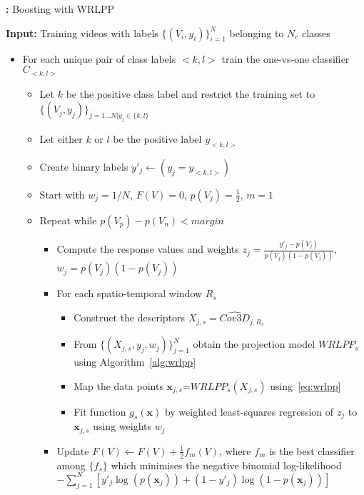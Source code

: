\documentclass[10pt,twocolumn,letterpaper]{article}
\newcommand{\alg}[1]{\mbox{Algorithm~\ref{#1}}}
\newcommand{\cov}{{Cov3D}}
\newcommand{\wrlpp}{WRLPP}
\newcommand{\vect}[1]{{\boldsymbol{#1}}}
\begin{document}
\begin{algorithm}
  \footnotesize
  \raggedright
  \caption{{\bf :} {\footnotesize Boosting with WRLPP}}
  \label{alg:logitboost}
  
  \textbf{Input:} Training videos with labels $\{(V_i,y_i)\}_{i=1}^{N}$ belonging to $N_c$ classes\\
  
  \begin{itemize} \leftskip-1em
    \item For each unique pair of class labels $<k,l>$ train the one-vs-one classifier $C_{<k,l>}$
      \begin{itemize} \leftskip-1em
        \item Let $k$ be the positive class label and restrict the training set to
              $\{(V_j,y_j)\}_{j=1...N|y_j \in \{k,l\}}$
        \item Let either $k$ or $l$ be the positive label $y_{<k,l>}$
        \item Create binary labels $y'_j \leftarrow (y_j = y_{<k,l>})$
        \item Start with $w_j=1/N$, $F(V)=0$, $p(V_j)=\frac{1}{2}$, $m=1$
        \item Repeat while $p(V_p) - p(V_n) < margin$
          \begin{itemize} \leftskip-1em
            \item Compute the response values and weights $z_j=\frac{y'_j-p(V_j)}{p(V_j)(1-p(V_j))}$, $w_j=p(V_j)(1-p(V_j))$
            \item For each spatio-temporal window $R_s$
              \begin{itemize} \leftskip-2em
                \item Construct the descriptors $X_{j,s}=\widehat{\cov}_{j,R_s}$
                \item From $\{(X_{j,s},y_j,w_j)\}_{j=1}^{N}$ obtain the projection model $\wrlpp_s$ using \alg{alg:wrlpp}
                \item Map the data points $\vect{x}_{j,s} \mbox{=} \wrlpp_s(X_{j,s})$ using~\eqref{eq:wrlpp}
                \item Fit function $g_s(\vect{x})$ by weighted least-squares regression of $z_j$ to $\vect{x}_{j,s}$ using weights $w_j$
              \end{itemize}
            \item Update $F(V) \leftarrow F(V) + \frac{1}{2}f_m(V)$, where $f_m$ is the best classifier among $\{f_s\}$ which
                  minimises the negative binomial log-likelihood $-\sum_{j=1}^N{[y'_j\log(p(\vect{x}_j))+(1-y'_j)\log(1-p(\vect{x}_j))]}$

\end{itemize}
\end{itemize}
\end{itemize}
\end{algorithm}
\end{document}
